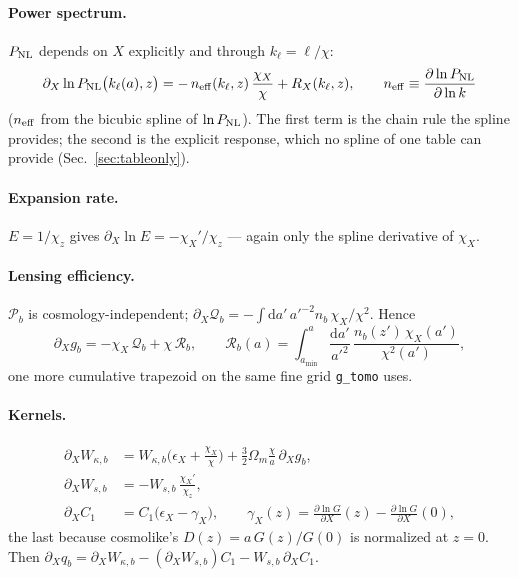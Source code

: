 \documentclass[11pt]{article}
\newcommand{\dd}{\mathrm{d}}
\newcommand{\pX}{\partial_X}
\begin{document}
\paragraph{Power spectrum.} $P_{\rm NL}$ depends on $X$ explicitly and through
$k_\ell=\ell/\chi$:
\begin{equation}
\pX\ln P_{\rm NL}\big(k_\ell(a),z\big)=
-\,n_{\rm eff}(k_\ell,z)\,\frac{\chi_X}{\chi}+R_X(k_\ell,z),
\qquad n_{\rm eff}\equiv\frac{\partial\ln P_{\rm NL}}{\partial\ln k}
\end{equation}
($n_{\rm eff}$ from the bicubic spline of $\ln P_{\rm NL}$). The first term is
the chain rule the spline provides; the second is the explicit response,
which no spline of one table can provide (Sec.~\ref{sec:tableonly}).

\paragraph{Expansion rate.} $E=1/\chi_z$ gives $\pX\ln E=-\chi_X'/\chi_z$ ---
again only the spline derivative of $\chi_X$.

\paragraph{Lensing efficiency.} $\mathcal P_b$ is cosmology-independent;
$\pX\mathcal Q_b=-\int\dd a'\,a'^{-2}n_b\,\chi_X/\chi^2$. Hence
\begin{equation}
\pX g_b=-\chi_X\,\mathcal Q_b+\chi\,\mathcal R_b,\qquad
\mathcal R_b(a)=\int_{a_{\min}}^{a}\frac{\dd a'}{a'^2}\,
\frac{n_b(z')\,\chi_X(a')}{\chi^2(a')},
\end{equation}
one more cumulative trapezoid on the same fine grid \texttt{g\_tomo} uses.

\paragraph{Kernels.}
\begin{align}
\pX W_{\kappa,b}&=W_{\kappa,b}\Big(\epsilon_X+\frac{\chi_X}{\chi}\Big)
+\tfrac32\Omega_m\frac{\chi}{a}\,\pX g_b,\\
\pX W_{s,b}&=-W_{s,b}\,\frac{\chi_X'}{\chi_z},\\
\pX C_1&=C_1\big(\epsilon_X-\gamma_X\big),\qquad
\gamma_X(z)=\frac{\partial\ln G}{\partial X}(z)-\frac{\partial\ln G}{\partial X}(0),
\end{align}
the last because cosmolike's $D(z)=a\,G(z)/G(0)$ is normalized at $z=0$.
Then $\pX q_b=\pX W_{\kappa,b}-(\pX W_{s,b})C_1-W_{s,b}\,\pX C_1$.
\end{document}
